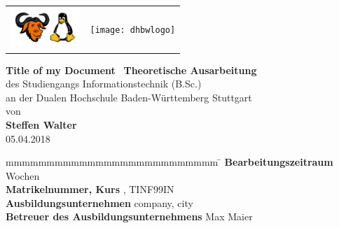\documentclass[
a4paper,   
titlepage,  
halfparskip,
12pt        
]{scrartcl}
\begin{document}
\pagestyle{fancy}
\fancyhf{} %
\fancyhead[R]{\thepage} %


\begin{titlepage}
\begin{longtable}{l|r}
{\includegraphics[height=1.5cm]{companylogo}} &
{\texttt{[image: dhbwlogo]}}
\end{longtable}
\bigskip
\bigskip
\begin{center}
\vspace*{12mm} {\LARGE\bf Title of my Document}\
\vspace*{12mm} %
\vspace*{3mm} {\large\bf Theoretische Ausarbeitung}\\
\vspace*{12mm} des Studiengangs Informationstechnik (B.Sc.)\\ an der Dualen Hochschule Baden-Württemberg Stuttgart\\
\vspace*{12mm} von\\
\vspace*{3mm} {\large\bf Steffen Walter}\\
\vspace*{12mm} 05.04.2018\\
\end{center}
\vfill
\begin{spacing}{1.5}
\begin{tabbing}
mmmmmmmmmmmmmmmmmmmmmmmmmm \= \kill
\textbf{Bearbeitungszeitraum}  Wochen\\
\textbf{Matrikelnummer, Kurs} , TINF99IN\\
\textbf{Ausbildungsunternehmen} \> company, city\\
\textbf{Betreuer des Ausbildungsunternehmens} \> Max Maier\\
\end{tabbing}
\end{spacing}
\end{titlepage}
\end{document}
